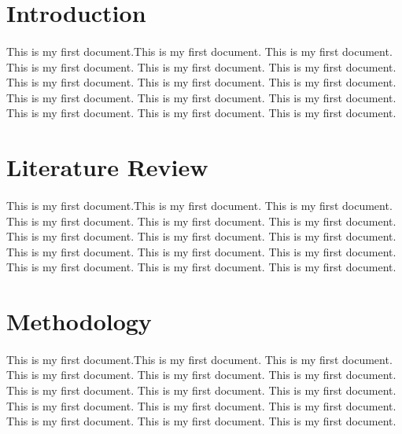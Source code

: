 \documentclass{article}
\begin{document}
	\pagestyle{empty}
	
	\section{Introduction}
		\paragraph{}
	
	This is my first document.This is my first document. This is my first document. This is my first document. This is my first document. This is my first document. This is my first document. This is my first document. This is my first document. This is my first document. This is my first document. This is my first document. This is my first document. This is my first document. This is my first document.
	\pagebreak
	
	\section{Literature Review}
		\paragraph{}
		
	This is my first document.This is my first document. This is my first document. This is my first document. This is my first document. This is my first document. This is my first document. This is my first document. This is my first document. This is my first document. This is my first document. This is my first document. This is my first document. This is my first document. This is my first document.
	\pagebreak
	
	\section{Methodology}
	\thispagestyle{headings}
		\paragraph{}
	
	This is my first document.This is my first document. This is my first document. This is my first document. This is my first document. This is my first document. This is my first document. This is my first document. This is my first document. This is my first document. This is my first document. This is my first document. This is my first document. This is my first document. This is my first document.
	
\end{document}
